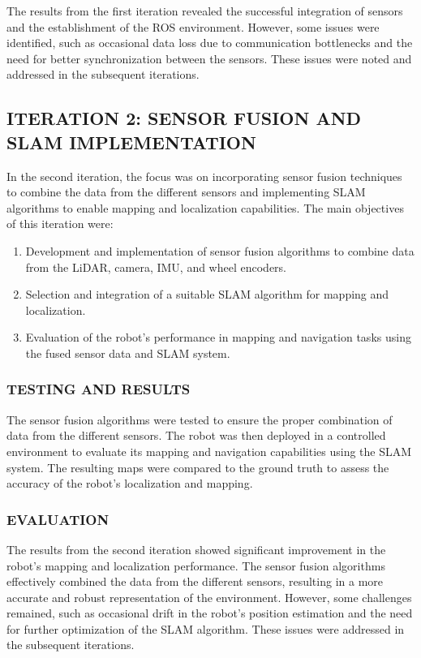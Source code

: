 \documentclass[12pt]{article}
\begin{document}
        The results from the first iteration revealed the successful integration of sensors and the establishment of the ROS environment. However, some issues were identified, such as occasional data loss due to communication bottlenecks and the need for better synchronization between the sensors. These issues were noted and addressed in the subsequent iterations.

    \subsection{ITERATION 2: SENSOR FUSION AND SLAM IMPLEMENTATION}

    In the second iteration, the focus was on incorporating sensor fusion techniques to combine the data from the different sensors and implementing SLAM algorithms to enable mapping and localization capabilities. The main objectives of this iteration were:
    
    \begin{enumerate}
        \item Development and implementation of sensor fusion algorithms to combine data from the LiDAR, camera, IMU, and wheel encoders.
        \item Selection and integration of a suitable SLAM algorithm for mapping and localization.
        \item Evaluation of the robot's performance in mapping and navigation tasks using the fused sensor data and SLAM system.
    \end{enumerate}
        
        \subsubsection{TESTING AND RESULTS}
        
        The sensor fusion algorithms were tested to ensure the proper combination of data from the different sensors. The robot was then deployed in a controlled environment to evaluate its mapping and navigation capabilities using the SLAM system. The resulting maps were compared to the ground truth to assess the accuracy of the robot's localization and mapping.
        
        \subsubsection{EVALUATION}
        
        The results from the second iteration showed significant improvement in the robot's mapping and localization performance. The sensor fusion algorithms effectively combined the data from the different sensors, resulting in a more accurate and robust representation of the environment. However, some challenges remained, such as occasional drift in the robot's position estimation and the need for further optimization of the SLAM algorithm. These issues were addressed in the subsequent iterations.
\end{document}

